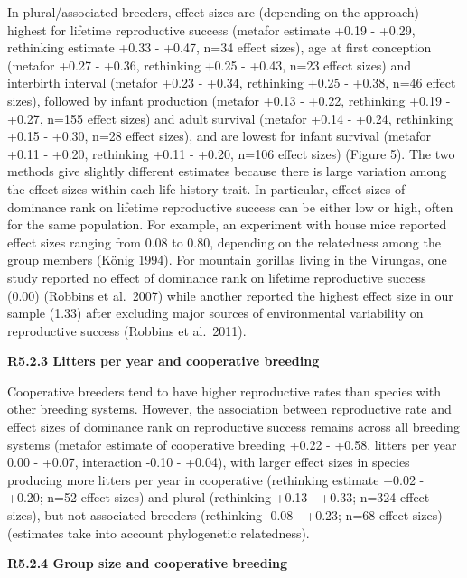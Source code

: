 \documentclass[
]{article}
\begin{document}
In plural/associated breeders, effect sizes are (depending on the
approach) highest for lifetime reproductive success (metafor estimate
+0.19 - +0.29, rethinking estimate +0.33 - +0.47, n=34 effect sizes),
age at first conception (metafor +0.27 - +0.36, rethinking +0.25 -
+0.43, n=23 effect sizes) and interbirth interval (metafor +0.23 -
+0.34, rethinking +0.25 - +0.38, n=46 effect sizes), followed by infant
production (metafor +0.13 - +0.22, rethinking +0.19 - +0.27, n=155
effect sizes) and adult survival (metafor +0.14 - +0.24, rethinking
+0.15 - +0.30, n=28 effect sizes), and are lowest for infant survival
(metafor +0.11 - +0.20, rethinking +0.11 - +0.20, n=106 effect sizes)
(Figure 5). The two methods give slightly different estimates because
there is large variation among the effect sizes within each life history
trait. In particular, effect sizes of dominance rank on lifetime
reproductive success can be either low or high, often for the same
population. For example, an experiment with house mice reported effect
sizes ranging from 0.08 to 0.80, depending on the relatedness among the
group members (König 1994). For mountain gorillas living in the
Virungas, one study reported no effect of dominance rank on lifetime
reproductive success (0.00) (Robbins et al.~2007) while another reported
the highest effect size in our sample (1.33) after excluding major
sources of environmental variability on reproductive success (Robbins et
al.~2011).

\textbf{R5.2.3 Litters per year and cooperative breeding}

Cooperative breeders tend to have higher reproductive rates than species
with other breeding systems. However, the association between
reproductive rate and effect sizes of dominance rank on reproductive
success remains across all breeding systems (metafor estimate of
cooperative breeding +0.22 - +0.58, litters per year 0.00 - +0.07,
interaction -0.10 - +0.04), with larger effect sizes in species
producing more litters per year in cooperative (rethinking estimate
+0.02 - +0.20; n=52 effect sizes) and plural (rethinking +0.13 - +0.33;
n=324 effect sizes), but not associated breeders (rethinking -0.08 -
+0.23; n=68 effect sizes) (estimates take into account phylogenetic
relatedness).

\textbf{R5.2.4 Group size and cooperative breeding}
\end{document}
